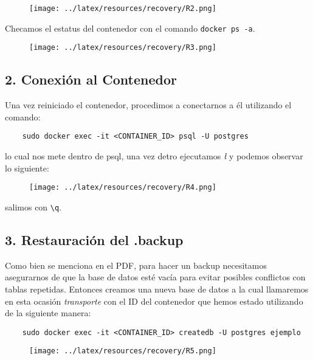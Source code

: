 \begin{figure}[h]
    \centering
        \texttt{[image: ../latex/resources/recovery/R2.png]}
    \end{figure}

Checamos el estatus del contenedor con el comando \texttt{docker ps -a}. \\

\begin{figure}[h]
    \centering
        \texttt{[image: ../latex/resources/recovery/R3.png]}
    \end{figure}

\subsection*{2. Conexión al Contenedor}

Una vez reiniciado el contenedor, procedimos a conectarnos a él utilizando el comando: \\

\begin{verbatim}
    sudo docker exec -it <CONTAINER_ID> psql -U postgres
\end{verbatim}

lo cual nos mete dentro de psql, una vez detro ejecutamos \textit{\l} y podemos observar lo siguiente: \\

\begin{figure}[h]
    \centering
        \texttt{[image: ../latex/resources/recovery/R4.png]}
\end{figure}

salimos con \texttt{\textbackslash q}.

\subsection*{3. Restauración del .backup}

Como bien se menciona en el PDF, para hacer un backup necesitamos asegurarnos de que la base de datos esté vacía para evitar posibles conflictos con tablas repetidas. Entonces creamos una nueva base de datos a la cual llamaremos en esta ocasión \textit{transporte} con el ID del contenedor que hemos estado utilizando de la siguiente manera: \\

\begin{verbatim}
    sudo docker exec -it <CONTAINER_ID> createdb -U postgres ejemplo
\end{verbatim}

\begin{figure}[h!]
    \centering
        \texttt{[image: ../latex/resources/recovery/R5.png]}
\end{figure}